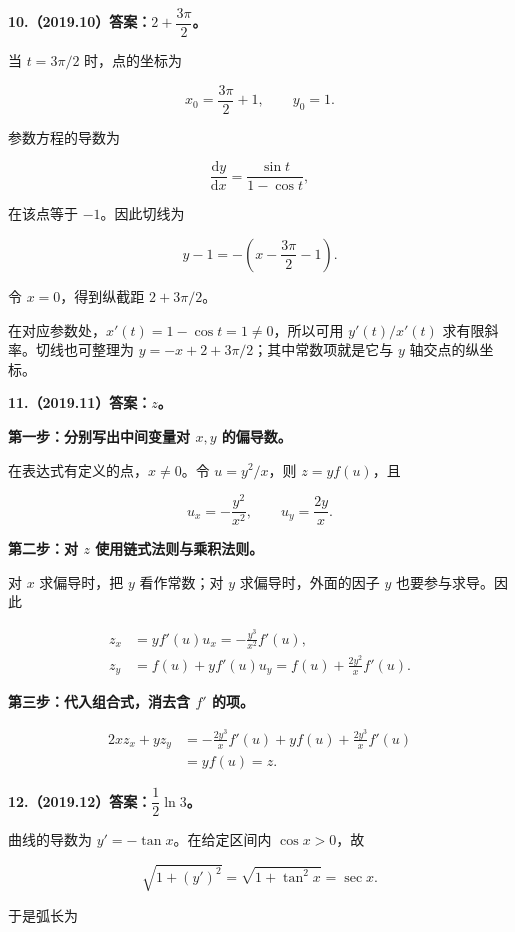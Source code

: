 \documentclass[UTF8,11pt,fontset=windows]{ctexart}
\begin{document}
\textbf{10.（2019.10）答案：$2+\dfrac{3\pi}{2}$。}

当 $t=3\pi/2$ 时，点的坐标为

$$
x_0=\frac{3\pi}{2}+1,\qquad y_0=1.
$$

参数方程的导数为

$$
\frac{\mathrm dy}{\mathrm dx}=
\frac{\sin t}{1-\cos t},
$$

在该点等于 $-1$。因此切线为

$$
y-1=-\left(x-\frac{3\pi}{2}-1\right).
$$

令 $x=0$，得到纵截距 $2+3\pi/2$。

在对应参数处，$x'(t)=1-\cos t=1\ne0$，所以可用 $y'(t)/x'(t)$ 求有限斜率。切线也可整理为 $y=-x+2+3\pi/2$；其中常数项就是它与 $y$ 轴交点的纵坐标。

\clearpage

\textbf{11.（2019.11）答案：$z$。}

\textbf{第一步：分别写出中间变量对 $x,y$ 的偏导数。}

在表达式有定义的点，$x\ne0$。令 $u=y^2/x$，则 $z=yf(u)$，且

$$
u_x=-\frac{y^2}{x^2},\qquad u_y=\frac{2y}{x}.
$$

\textbf{第二步：对 $z$ 使用链式法则与乘积法则。}

对 $x$ 求偏导时，把 $y$ 看作常数；对 $y$ 求偏导时，外面的因子 $y$ 也要参与求导。因此

$$
\begin{aligned}
z_x&=y f'(u)u_x=-\frac{y^3}{x^2}f'(u),\\
z_y&=f(u)+yf'(u)u_y=f(u)+\frac{2y^2}{x}f'(u).
\end{aligned}
$$

\textbf{第三步：代入组合式，消去含 $f'$ 的项。}

$$
\begin{aligned}
2xz_x+yz_y
&=-\frac{2y^3}{x}f'(u)+yf(u)+\frac{2y^3}{x}f'(u)\\
&=yf(u)=\boxed{z}.
\end{aligned}
$$

\clearpage

\textbf{12.（2019.12）答案：$\dfrac12\ln3$。}

曲线的导数为 $y'=-\tan x$。在给定区间内 $\cos x>0$，故

$$
\sqrt{1+(y')^2}=\sqrt{1+\tan^2x}=\sec x.
$$

于是弧长为
\end{document}
